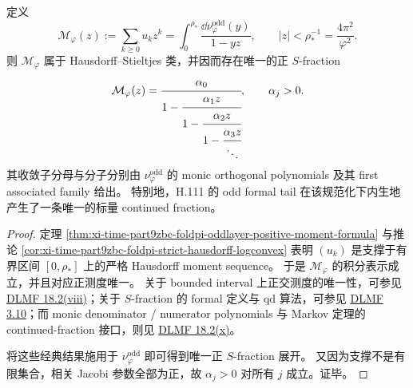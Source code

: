 \begin{proposition}\label{prop:xi-time-part9zbc-foldpi-canonical-positive-sfraction}
定义
\[
\mathcal M_\varphi(z):=\sum_{k\ge 0}u_k z^k
=
\int_0^{\rho_\ast}\frac{\dd\nu_{\varphi}^{\mathrm{odd}}(y)}{1-yz},
\qquad |z|<\rho_\ast^{-1}=\frac{4\pi^2}{\varphi^2}.
\]
则 \(\mathcal M_\varphi\) 属于 Hausdorff--Stieltjes 类，并因而存在唯一的正 \(S\)-fraction
\[
\mathcal M_\varphi(z)
=
\cfrac{\alpha_0}{1-\cfrac{\alpha_1 z}{1-\cfrac{\alpha_2 z}{1-\cfrac{\alpha_3 z}{\ddots}}}},
\qquad
\alpha_j>0.
\]
其收敛子分母与分子分别由 \(\nu_{\varphi}^{\mathrm{odd}}\) 的 monic orthogonal polynomials 及其 first associated family 给出。
特别地，H.111 的 odd formal tail 在该规范化下内生地产生了一条唯一的标量 continued fraction。
\end{proposition}
\begin{proof}
定理 \ref{thm:xi-time-part9zbc-foldpi-oddlayer-positive-moment-formula} 与推论 \ref{cor:xi-time-part9zbc-foldpi-strict-hausdorff-logconvex} 表明 \((u_k)\) 是支撑于有界区间 \([0,\rho_\ast]\) 上的严格 Hausdorff moment sequence。
于是 \(\mathcal M_\varphi\) 的积分表示成立，并且对应正测度唯一。
关于 bounded interval 上正交测度的唯一性，可参见 \href{https://dlmf.nist.gov/18.2.viii}{DLMF 18.2(viii)}；关于 \(S\)-fraction 的 formal 定义与 qd 算法，可参见 \href{https://dlmf.nist.gov/3.10}{DLMF 3.10}；而 monic denominator / numerator polynomials 与 Markov 定理的 continued-fraction 接口，则见 \href{https://dlmf.nist.gov/18.2.x}{DLMF 18.2(x)}。

将这些经典结果施用于 \(\nu_{\varphi}^{\mathrm{odd}}\) 即可得到唯一正 \(S\)-fraction 展开。
又因为支撑不是有限集合，相关 Jacobi 参数全部为正，故 \(\alpha_j>0\) 对所有 \(j\) 成立。证毕。
\end{proof}

